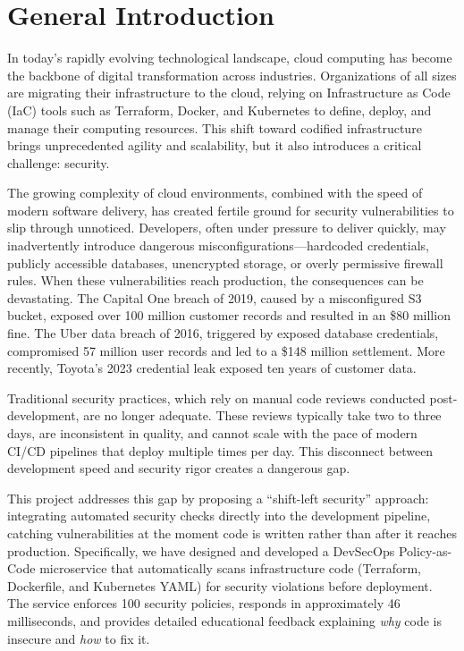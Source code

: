 
\chapter*{General Introduction}

In today's rapidly evolving technological landscape, cloud computing has become the backbone of digital transformation across industries. Organizations of all sizes are migrating their infrastructure to the cloud, relying on Infrastructure as Code (IaC) tools such as Terraform, Docker, and Kubernetes to define, deploy, and manage their computing resources. This shift toward codified infrastructure brings unprecedented agility and scalability, but it also introduces a critical challenge: security.

The growing complexity of cloud environments, combined with the speed of modern software delivery, has created fertile ground for security vulnerabilities to slip through unnoticed. Developers, often under pressure to deliver quickly, may inadvertently introduce dangerous misconfigurations—hardcoded credentials, publicly accessible databases, unencrypted storage, or overly permissive firewall rules. When these vulnerabilities reach production, the consequences can be devastating. The Capital One breach of 2019, caused by a misconfigured S3 bucket, exposed over 100 million customer records and resulted in an \$80 million fine. The Uber data breach of 2016, triggered by exposed database credentials, compromised 57 million user records and led to a \$148 million settlement. More recently, Toyota's 2023 credential leak exposed ten years of customer data.

Traditional security practices, which rely on manual code reviews conducted post-development, are no longer adequate. These reviews typically take two to three days, are inconsistent in quality, and cannot scale with the pace of modern CI/CD pipelines that deploy multiple times per day. This disconnect between development speed and security rigor creates a dangerous gap.

This project addresses this gap by proposing a ``shift-left security'' approach: integrating automated security checks directly into the development pipeline, catching vulnerabilities at the moment code is written rather than after it reaches production. Specifically, we have designed and developed a DevSecOps Policy-as-Code microservice that automatically scans infrastructure code (Terraform, Dockerfile, and Kubernetes YAML) for security violations before deployment. The service enforces 100 security policies, responds in approximately 46 milliseconds, and provides detailed educational feedback explaining \textit{why} code is insecure and \textit{how} to fix it.

